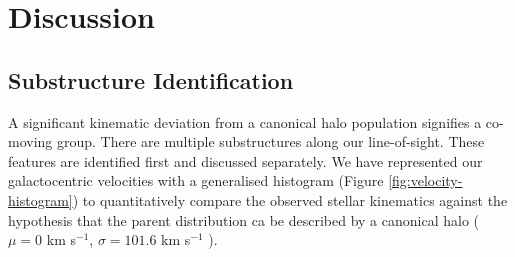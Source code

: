 \documentclass[preprint2]{aastex}
\begin{document}

\section{Discussion}
\label{sec:discussion}
	
		
	\subsection{Substructure Identification}
	\label{sec:substructure-identification}
		
A significant kinematic deviation from a canonical halo population signifies a co-moving group. There are multiple substructures along our line-of-sight. These features are identified first and discussed separately. We have represented our galactocentric velocities with a generalised histogram (Figure \ref{fig:velocity-histogram}) to quantitatively compare the observed stellar kinematics against the hypothesis that the parent distribution ca be described by a canonical halo ($\mu = 0$ km s$^{-1}$, $\sigma = 101.6$ km s$^{-1}$ \citep{Sirko;et-al_2004}).
\end{document}

